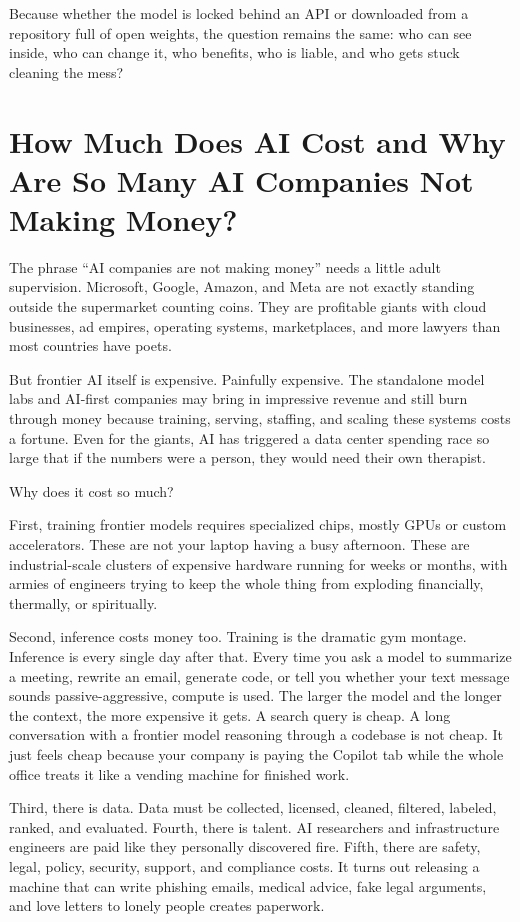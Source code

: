 \documentclass[12pt,oneside]{book}
\begin{document}
Because whether the model is locked behind an API or downloaded from a repository full of open weights, the question remains the same: who can see inside, who can change it, who benefits, who is liable, and who gets stuck cleaning the mess?

\chapter{How Much Does AI Cost and Why Are So Many AI Companies Not Making Money?}

The phrase ``AI companies are not making money'' needs a little adult supervision. Microsoft, Google, Amazon, and Meta are not exactly standing outside the supermarket counting coins. They are profitable giants with cloud businesses, ad empires, operating systems, marketplaces, and more lawyers than most countries have poets.

But frontier AI itself is expensive. Painfully expensive. The standalone model labs and AI-first companies may bring in impressive revenue and still burn through money because training, serving, staffing, and scaling these systems costs a fortune. Even for the giants, AI has triggered a data center spending race so large that if the numbers were a person, they would need their own therapist.

Why does it cost so much?

First, training frontier models requires specialized chips, mostly GPUs or custom accelerators. These are not your laptop having a busy afternoon. These are industrial-scale clusters of expensive hardware running for weeks or months, with armies of engineers trying to keep the whole thing from exploding financially, thermally, or spiritually.

Second, inference costs money too. Training is the dramatic gym montage. Inference is every single day after that. Every time you ask a model to summarize a meeting, rewrite an email, generate code, or tell you whether your text message sounds passive-aggressive, compute is used. The larger the model and the longer the context, the more expensive it gets. A search query is cheap. A long conversation with a frontier model reasoning through a codebase is not cheap. It just feels cheap because your company is paying the Copilot tab while the whole office treats it like a vending machine for finished work.

Third, there is data. Data must be collected, licensed, cleaned, filtered, labeled, ranked, and evaluated. Fourth, there is talent. AI researchers and infrastructure engineers are paid like they personally discovered fire. Fifth, there are safety, legal, policy, security, support, and compliance costs. It turns out releasing a machine that can write phishing emails, medical advice, fake legal arguments, and love letters to lonely people creates paperwork.
\end{document}
